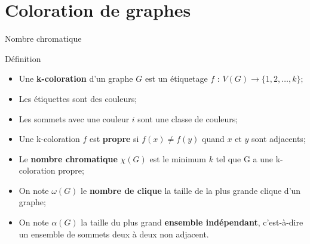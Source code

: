 \documentclass[10pt,xcolor=dvipsnames]{beamer}
\newcommand{\defin}[1]{\textcolor{darkspringgreen}{#1}}
\begin{document}
\section{Coloration de graphes}
\begin{frame}{Nombre chromatique}
    \begin{exampleblock}{Définition}
            \begin{itemize}
                \item Une \defin{\textbf{k-coloration}} d'un graphe $G$ est un étiquetage $f$ : $V(G) \rightarrow \{ 1, 2, \ldots, k \}$;
                \item Les étiquettes sont des \defin{couleurs};
                \item Les sommets avec une couleur $i$ sont une \defin{classe de couleurs};
                \item Une \defin{k-coloration} $f$ est \textbf{\defin{propre}} si $f(x) \not\equal f(y)$ quand $x$ et $y$ sont adjacents;
                \item Le \defin{\textbf{nombre chromatique}} $\chi(G)$ est le minimum $k$ tel
                que G a une \defin{k-coloration propre};
                \item On note $\omega(G)$ le \defin{\textbf{nombre de clique}} la taille de la plus grande \defin{clique} d'un graphe;
                \item On note $\alpha(G)$ la taille du plus grand \textbf{\defin{ensemble indépendant}}, c'est-à-dire un ensemble de sommets deux à deux non \defin{adjacent}.
            \end{itemize} 
    \end{exampleblock}
\end{frame}
\end{document}
